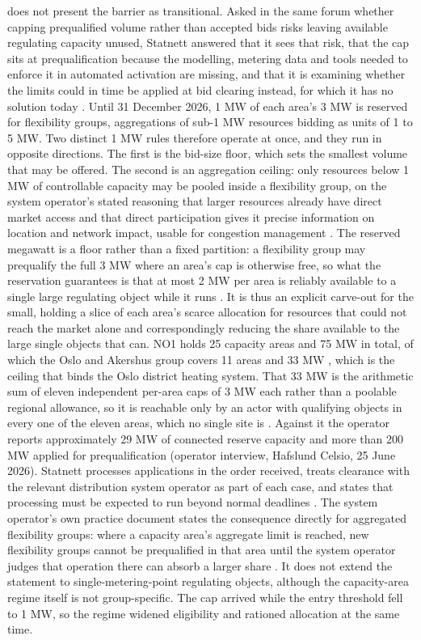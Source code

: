 does not present the barrier as transitional. Asked in the same forum whether capping prequalified volume rather than accepted bids risks leaving available regulating capacity unused, Statnett answered that it sees that risk, that the cap sits at prequalification because the modelling, metering data and tools needed to enforce it in automated activation are missing, and that it is examining whether the limits could in time be applied at bid clearing instead, for which it has no solution today \cite{statnett_sporsmal_2026}. Until 31 December 2026, 1 MW of each area's 3 MW is reserved for flexibility groups, aggregations of sub-1 MW resources bidding as units of 1 to 5 MW. Two distinct 1 MW rules therefore operate at once, and they run in opposite directions. The first is the bid-size floor, which sets the smallest volume that may be offered. The second is an aggregation ceiling: only resources below 1 MW of controllable capacity may be pooled inside a flexibility group, on the system operator's stated reasoning that larger resources already have direct market access and that direct participation gives it precise information on location and network impact, usable for congestion management \cite{statnett_praktisering_2026}. The reserved megawatt is a floor rather than a fixed partition: a flexibility group may prequalify the full 3 MW where an area's cap is otherwise free, so what the reservation guarantees is that at most 2 MW per area is reliably available to a single large regulating object while it runs \cite{statnett_innforing_2026}. It is thus an explicit carve-out for the small, holding a slice of each area's scarce allocation for resources that could not reach the market alone and correspondingly reducing the share available to the large single objects that can. NO1 holds 25 capacity areas and 75 MW in total, of which the Oslo and Akershus group covers 11 areas and 33 MW \cite{statnett_innforing_2026}, which is the ceiling that binds the Oslo district heating system. That 33 MW is the arithmetic sum of eleven independent per-area caps of 3 MW each rather than a poolable regional allowance, so it is reachable only by an actor with qualifying objects in every one of the eleven areas, which no single site is \cite{statnett_innforing_2026}. Against it the operator reports approximately 29 MW of connected reserve capacity and more than 200 MW applied for prequalification (operator interview, Hafslund Celsio, 25 June 2026). Statnett processes applications in the order received, treats clearance with the relevant distribution system operator as part of each case, and states that processing must be expected to run beyond normal deadlines \cite{statnett_innforing_2026}. The system operator's own practice document states the consequence directly for aggregated flexibility groups: where a capacity area's aggregate limit is reached, new flexibility groups cannot be prequalified in that area until the system operator judges that operation there can absorb a larger share \cite{statnett_praktisering_2026}. It does not extend the statement to single-metering-point regulating objects, although the capacity-area regime itself is not group-specific. The cap arrived while the entry threshold fell to 1 MW, so the regime widened eligibility and rationed allocation at the same time.

